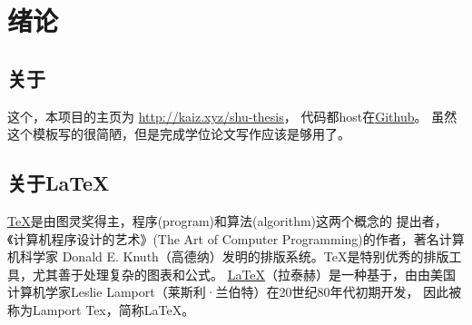 \documentclass[UTF8]{ctexart}
\numberwithin{equation}{section} %
\numberwithin{table}{section} %
\begin{document}
 
\setcounter{page}{7}  %

{\hypersetup{linkcolor=black}
\tableofcontents}

\pagebreak
\section{绪论}
\setcounter{page}{1}
\subsection{关于}
这个，本项目的主页为 \url{http://kaiz.xyz/shu-thesis}，
代码都host在\href{https://github.com/zeakey/shu-thesis}{Github}。
%
虽然这个模板写的很简陋，但是完成学位论文写作应该是够用了。

\subsection{关于\LaTeX}
\href{https://en.wikipedia.org/wiki/TeX}{\TeX}是由图灵奖得主，程序(program)和算法(algorithm)这两个概念的
提出者，《计算机程序设计的艺术》(The Art of Computer Programming)的作者，著名计算机科学家
Donald E. Knuth（高德纳）发明的排版系统。TeX是特别优秀的排版工具，尤其善于处理复杂的图表和公式。
%
\href{https://en.wikipedia.org/wiki/LaTeX}{\LaTeX}（拉泰赫）是一种基于，由由美国计算机学家Leslie Lamport（莱斯利·兰伯特）在20世纪80年代初期开发，
因此被称为Lamport Tex，简称LaTeX。
\end{document}
